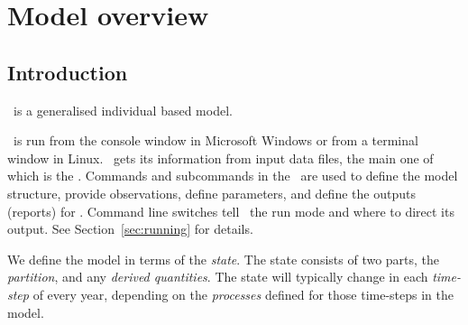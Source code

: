 \section{Model overview\label{sec:overview}}

\subsection{Introduction}

\IBM\ is a generalised individual based model. 

\IBM\ is run from the console window in Microsoft Windows or from a terminal window in Linux. \IBM\ gets its information from input data files, the main one of which is the \emph{\config}. Commands and subcommands in the \config\ are used to define the model structure, provide observations, define parameters, and define the outputs (reports) for \IBM. Command line switches tell \IBM\ the run mode and where to direct its output. See Section~\ref{sec:running} for details.

We define the model in terms of the \emph{state}. The state consists of two parts, the \emph{partition}, and any \emph{derived quantities}. The state will typically change in each \emph{time-step} of every year, depending on the \emph{processes} defined for those time-steps in the model. 

\subsection{}


\subsection{}

\subsection{}

\subsection{}
